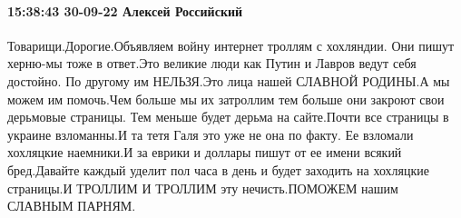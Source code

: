  
 
 
 
 

\paragraph{15:38:43 30-09-22 Алексей Российский}

Товарищи.Дорогие.Объявляем войну интернет троллям с хохляндии. Они пишут
херню-мы тоже в ответ.Это великие люди как Путин и Лавров ведут себя достойно.
По другому им НЕЛЬЗЯ.Это лица нашей СЛАВНОЙ РОДИНЫ.А мы можем им помочь.Чем
больше мы их затроллим тем больше они закроют свои дерьмовые страницы. Тем
меньше будет дерьма на сайте.Почти все страницы в украине взломанны.И та тетя
Галя это уже не она по факту. Ее взломали хохляцкие наемники.И за еврики и
доллары пишут от ее имени всякий бред.Давайте каждый уделит пол часа в день и
будет заходить на хохляцкие страницы.И ТРОЛЛИМ И ТРОЛЛИМ эту нечисть.ПОМОЖЕМ
нашим СЛАВНЫМ ПАРНЯМ.
